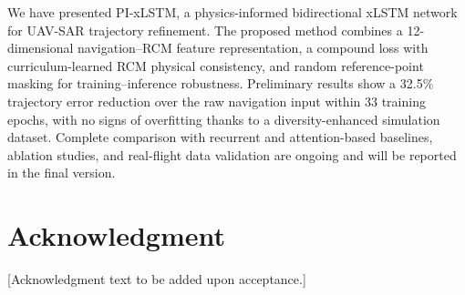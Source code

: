 \documentclass[conference]{IEEEtran}
\begin{document}
We have presented PI-xLSTM, a physics-informed bidirectional xLSTM network
for UAV-SAR trajectory refinement.
The proposed method combines a 12-dimensional navigation–RCM feature
representation, a compound loss with curriculum-learned RCM physical
consistency, and random reference-point masking for training–inference robustness.
Preliminary results show a 32.5\% trajectory error reduction over the raw
navigation input within 33 training epochs, with no signs of overfitting
thanks to a diversity-enhanced simulation dataset.
Complete comparison with recurrent and attention-based baselines,
ablation studies, and real-flight data validation are ongoing
and will be reported in the final version.

\section*{Acknowledgment}
[Acknowledgment text to be added upon acceptance.]



\end{document}
